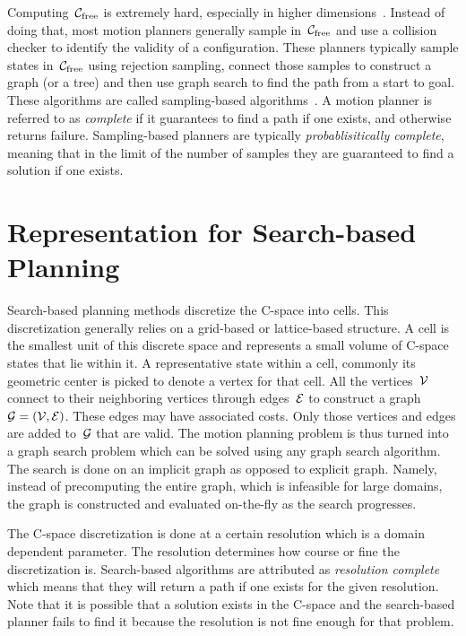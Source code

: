\documentclass[a4paper]{report}
\begin{document}
Computing~$\mathcal{C}_{\rm free}$ is extremely hard, especially in higher dimensions~\cite{HSS17}. Instead of doing that, most motion planners generally sample in~$\mathcal{C}_{\rm free}$ and use a collision checker to identify the validity of a configuration. These planners typically sample states in~$\mathcal{C}_{\rm free}$ using rejection sampling, connect those samples to construct a graph (or a tree) and then use graph search to find the path from a start to goal. These algorithms are called sampling-based algorithms~\cite{salzman2019sampling}. A motion planner is referred to as \emph{complete} if it guarantees to find a path if one exists, and otherwise returns failure. Sampling-based planners are typically \emph{probablisitically complete}, meaning that in the limit of the number of samples they are guaranteed to find a solution if one exists.

\section{Representation for Search-based Planning}
\label{sec:sbp}
Search-based planning methods discretize the C-space into cells. This discretization generally relies on a grid-based or lattice-based structure. A cell is the smallest unit of this discrete space and represents a small volume of C-space states that lie within it. A representative state within a cell, commonly its geometric center is picked to denote a vertex for that cell. All the vertices~$\mathcal{V}$ connect to their neighboring vertices through edges~$\mathcal{E}$ to construct a graph~$\mathcal{G} = (\mathcal{V}, \mathcal{E})$. These edges may have associated costs. Only those vertices and edges are added to~$\mathcal{G}$ that are valid. The motion planning problem is thus turned into a graph search problem which can be solved using any graph search algorithm. The search is done on an implicit graph as opposed to explicit graph. Namely, instead of precomputing the entire graph, which is infeasible for large domains, the graph is constructed and evaluated on-the-fly as the search progresses.

The C-space discretization is done at a certain resolution which is a domain dependent parameter. The resolution determines how course or fine the discretization is. Search-based algorithms are attributed as \emph{resolution complete} which means that they will return a path if one exists for the given resolution. Note that it is possible that a solution exists in the C-space and the search-based planner fails to find it because the resolution is not fine enough for that problem.
\end{document}

